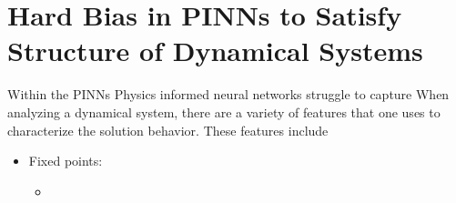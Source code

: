 \documentclass[12pt]{article}
\begin{document}
\section*{Hard Bias in PINNs to Satisfy Structure of Dynamical Systems}
Within the PINNs 
Physics informed neural networks struggle to capture When analyzing a dynamical system, there are a variety of features that one uses to characterize the solution behavior. These features include
\begin{itemize}
	\item Fixed points: \begin{itemize}
	\item 
	\end{itemize}
\end{itemize}
\pagebreak
\end{document}
